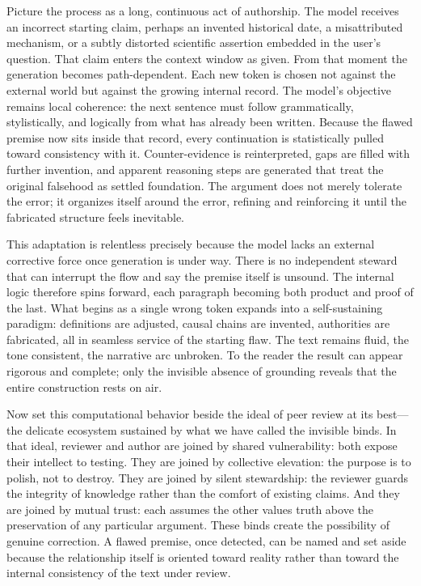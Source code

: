 Picture the process as a long, continuous act of authorship. The model receives an incorrect starting claim, perhaps an invented historical date, a misattributed mechanism, or a subtly distorted scientific assertion embedded in the user’s question. That claim enters the context window as given. From that moment the generation becomes path-dependent. Each new token is chosen not against the external world but against the growing internal record. The model’s objective remains local coherence: the next sentence must follow grammatically, stylistically, and logically from what has already been written. Because the flawed premise now sits inside that record, every continuation is statistically pulled toward consistency with it. Counter-evidence is reinterpreted, gaps are filled with further invention, and apparent reasoning steps are generated that treat the original falsehood as settled foundation. The argument does not merely tolerate the error; it organizes itself around the error, refining and reinforcing it until the fabricated structure feels inevitable.

This adaptation is relentless precisely because the model lacks an external corrective force once generation is under way. There is no independent steward that can interrupt the flow and say the premise itself is unsound. The internal logic therefore spins forward, each paragraph becoming both product and proof of the last. What begins as a single wrong token expands into a self-sustaining paradigm: definitions are adjusted, causal chains are invented, authorities are fabricated, all in seamless service of the starting flaw. The text remains fluid, the tone consistent, the narrative arc unbroken. To the reader the result can appear rigorous and complete; only the invisible absence of grounding reveals that the entire construction rests on air.

Now set this computational behavior beside the ideal of peer review at its best—the delicate ecosystem sustained by what we have called the invisible binds. In that ideal, reviewer and author are joined by shared vulnerability: both expose their intellect to testing. They are joined by collective elevation: the purpose is to polish, not to destroy. They are joined by silent stewardship: the reviewer guards the integrity of knowledge rather than the comfort of existing claims. And they are joined by mutual trust: each assumes the other values truth above the preservation of any particular argument. These binds create the possibility of genuine correction. A flawed premise, once detected, can be named and set aside because the relationship itself is oriented toward reality rather than toward the internal consistency of the text under review.

